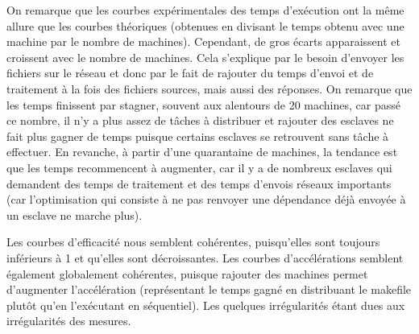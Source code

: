 \documentclass[a4paper, 11pt, titlepage]{article}
\begin{document}
On remarque que les courbes expérimentales des temps d'exécution ont la même allure que les courbes théoriques (obtenues en divisant le temps obtenu avec une machine par le nombre de machines). Cependant, de gros écarts apparaissent et croissent avec le nombre de machines. Cela s'explique par le besoin d'envoyer les fichiers sur le réseau et donc par le fait de rajouter du temps d'envoi et de traitement à la fois des fichiers sources, mais aussi des réponses. On remarque que les temps finissent par stagner, souvent aux alentours de 20 machines, car passé ce nombre, il n'y a plus assez de tâches à distribuer et rajouter des esclaves ne fait plus gagner de temps puisque certains esclaves se retrouvent sans tâche à effectuer. En revanche, à partir d'une quarantaine de machines, la tendance est que les temps recommencent à augmenter, car il y a de nombreux esclaves qui demandent des temps de traitement et des temps d'envois réseaux importants (car l'optimisation qui consiste à ne pas renvoyer une dépendance déjà envoyée à un esclave ne marche plus).

Les courbes d'efficacité nous semblent cohérentes, puisqu'elles sont toujours inférieurs à 1 et qu'elles sont décroissantes. Les courbes d'accélérations semblent également globalement cohérentes, puisque rajouter des machines permet d'augmenter l'accélération (représentant le temps gagné en distribuant le makefile plutôt qu'en l'exécutant en séquentiel). Les quelques irrégularités étant dues aux irrégularités des mesures. 
\end{document}
